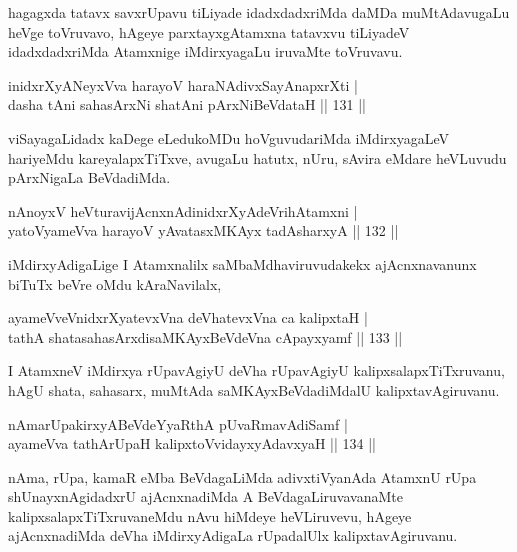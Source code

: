 \begin{artha}
hagagxda tatavx savxrUpavu tiLiyade idadxdadxriMda daMDa muMtAdavugaLu
heVge toVruvavo, hAgeye parxtayxgAtamxna tatavxvu tiLiyadeV
idadxdadxriMda Atamxnige iMdirxyagaLu iruvaMte toVruvavu.
\end{artha}


\begin{shl}
inidxrXyANeyxVva harayoV haraNAdivxSayAnapxrXti |\\
dasha tAni sahasArxNi shatAni pArxNiBeVdataH \hfill || 131 ||
\end{shl}

\begin{artha}
viSayagaLidadx kaDege eLedukoMDu hoVguvudariMda iMdirxyagaLeV hariyeMdu kareyalapxTiTxve, avugaLu hatutx, nUru, sAvira eMdare heVLuvudu pArxNigaLa BeVdadiMda.
\end{artha}

\begin{shl}
nAnoyxV heVturavijAcnxnAdinidxrXyAdeVrihA\s \s tamxni |\\
yatoV\s yameVva harayoV yAvatasxMKAyx tadAsharxyA \hfill || 132 ||
\end{shl}

\begin{artha}
iMdirxyAdigaLige I Atamxnalilx saMbaMdhaviruvudakekx ajAcnxnavanunx
biTuTx beVre oMdu kAraNavilalx,
\end{artha}

\begin{shl}
ayameVveVnidxrXyatevxVna deVhatevxVna ca kalipxtaH |\\
tathA shatasahasArxdisaMKAyxBeVdeVna cApayxyamf \hfill || 133 ||
\end{shl}

\begin{artha}
I AtamxneV iMdirxya rUpavAgiyU deVha rUpavAgiyU kalipxsalapxTiTxruvanu, hAgU shata, sahasarx, muMtAda saMKAyxBeVdadiMdalU kalipxtavAgiruvanu.
\end{artha}

\begin{shl}
nAmarUpakirxyABeVdeYyaRthA pUvaRmavAdiSamf |\\
ayameVva tathA\s rUpaH kalipxtoV\s vidayxyA\s davxyaH \hfill || 134 ||
\end{shl}

\begin{artha}
nAma, rUpa, kamaR eMba BeVdagaLiMda adivxtiVyanAda AtamxnU rUpa shUnayxnAgidadxrU ajAcnxnadiMda A BeVdagaLiruvavanaMte kalipxsalapxTiTxruvaneMdu nAvu hiMdeye heVLiruvevu, hAgeye ajAcnxnadiMda deVha iMdirxyAdigaLa rUpadalUlx kalipxtavAgiruvanu.
\end{artha}

